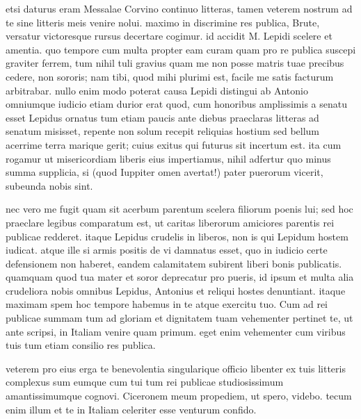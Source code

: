 


 etsi daturus eram Messalae Corvino continuo litteras, tamen veterem nostrum ad te sine litteris meis venire nolui. maximo in discrimine res publica, Brute, versatur victoresque rursus decertare cogimur. id accidit M. Lepidi scelere et amentia. quo tempore cum multa propter eam curam quam pro re publica suscepi graviter ferrem, tum nihil tuli gravius quam me non posse matris tuae precibus cedere, non sororis; nam tibi, quod mihi plurimi est, facile me satis facturum arbitrabar. nullo enim modo poterat causa Lepidi distingui ab Antonio omniumque iudicio etiam durior erat quod, cum honoribus amplissimis a senatu esset Lepidus ornatus tum etiam paucis ante diebus praeclaras litteras ad senatum misisset, repente non solum recepit reliquias hostium sed bellum acerrime terra marique gerit; cuius exitus qui futurus sit incertum est. ita cum rogamur ut misericordiam liberis eius impertiamus, nihil adfertur quo minus summa supplicia, si (quod Iuppiter omen avertat!) pater puerorum vicerit, subeunda nobis sint.

 nec vero me fugit quam sit acerbum parentum scelera filiorum poenis lui; sed hoc praeclare legibus comparatum est, ut caritas liberorum amiciores parentis rei publicae redderet. itaque Lepidus crudelis in liberos, non is qui Lepidum hostem iudicat. atque ille si armis positis de vi damnatus esset, quo in iudicio certe defensionem non haberet, eandem calamitatem subirent liberi bonis publicatis. quamquam quod tua mater et soror deprecatur pro pueris, id ipsum et multa alia crudeliora nobis omnibus Lepidus, Antonius et reliqui hostes denuntiant. itaque maximam spem hoc tempore habemus in te atque exercitu tuo. Cum ad rei publicae summam tum ad gloriam et dignitatem tuam vehementer pertinet te, ut ante scripsi, in Italiam venire quam primum. eget enim vehementer cum viribus tuis tum etiam consilio res publica.

 veterem pro eius erga te benevolentia singularique officio libenter ex tuis litteris complexus sum eumque cum tui tum rei publicae studiosissimum amantissimumque cognovi. Ciceronem meum propediem, ut spero, videbo. tecum enim illum et te in Italiam celeriter esse venturum confido.
